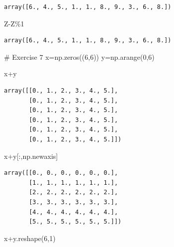 \documentclass[
  letterpaper,
  DIV=11,
  numbers=noendperiod]{scrreprt}
\newenvironment{Shaded}{\begin{snugshade}}{\end{snugshade}}
\newcommand{\CommentTok}[1]{\textcolor[rgb]{0.37,0.37,0.37}{#1}}
\newcommand{\DecValTok}[1]{\textcolor[rgb]{0.68,0.00,0.00}{#1}}
\newcommand{\NormalTok}[1]{\textcolor[rgb]{0.00,0.23,0.31}{#1}}
\newcommand{\OperatorTok}[1]{\textcolor[rgb]{0.37,0.37,0.37}{#1}}
\begin{document}
\begin{verbatim}
array([6., 4., 5., 1., 1., 8., 9., 3., 6., 8.])
\end{verbatim}

\begin{Shaded}
\begin{Highlighting}[]
\NormalTok{Z}\OperatorTok{{-}}\NormalTok{Z}\OperatorTok{\%}\DecValTok{1}
\end{Highlighting}
\end{Shaded}

\begin{verbatim}
array([6., 4., 5., 1., 1., 8., 9., 3., 6., 8.])
\end{verbatim}

\begin{Shaded}
\begin{Highlighting}[]
\CommentTok{\# Exercise 7}
\NormalTok{x}\OperatorTok{=}\NormalTok{np.zeros((}\DecValTok{6}\NormalTok{,}\DecValTok{6}\NormalTok{))}
\NormalTok{y}\OperatorTok{=}\NormalTok{np.arange(}\DecValTok{0}\NormalTok{,}\DecValTok{6}\NormalTok{)}
\end{Highlighting}
\end{Shaded}

\begin{Shaded}
\begin{Highlighting}[]
\NormalTok{x}\OperatorTok{+}\NormalTok{y}
\end{Highlighting}
\end{Shaded}

\begin{verbatim}
array([[0., 1., 2., 3., 4., 5.],
       [0., 1., 2., 3., 4., 5.],
       [0., 1., 2., 3., 4., 5.],
       [0., 1., 2., 3., 4., 5.],
       [0., 1., 2., 3., 4., 5.],
       [0., 1., 2., 3., 4., 5.]])
\end{verbatim}

\begin{Shaded}
\begin{Highlighting}[]
\NormalTok{x}\OperatorTok{+}\NormalTok{y[:,np.newaxis]}
\end{Highlighting}
\end{Shaded}

\begin{verbatim}
array([[0., 0., 0., 0., 0., 0.],
       [1., 1., 1., 1., 1., 1.],
       [2., 2., 2., 2., 2., 2.],
       [3., 3., 3., 3., 3., 3.],
       [4., 4., 4., 4., 4., 4.],
       [5., 5., 5., 5., 5., 5.]])
\end{verbatim}

\begin{Shaded}
\begin{Highlighting}[]
\NormalTok{x}\OperatorTok{+}\NormalTok{y.reshape(}\DecValTok{6}\NormalTok{,}\DecValTok{1}\NormalTok{)}
\end{Highlighting}
\end{Shaded}
\end{document}
